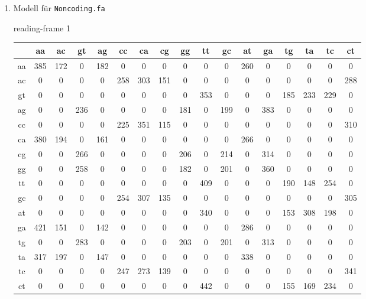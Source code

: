 \documentclass{homework}
\begin{document}
\begin{enumerate}
\begin{enumerate}
\normalsize

\item Modell für \texttt{Noncoding.fa}

reading-frame 1
\tiny

\begin{tabular}{c|cccccccccccccccc}
   & aa & ac & gt & ag & cc & ca & cg & gg & tt & gc & at & ga & tg & ta & tc & ct\\\hline
aa & 385 & 172 &   0 & 182 &   0 &   0 &   0 &   0 &   0 &   0 & 260 &   0 &   0 &   0 &   0 &   0\\
ac &   0 &   0 &   0 &   0 & 258 & 303 & 151 &   0 &   0 &   0 &   0 &   0 &   0 &   0 &   0 & 288\\
gt &   0 &   0 &   0 &   0 &   0 &   0 &   0 &   0 & 353 &   0 &   0 &   0 & 185 & 233 & 229 &   0\\
ag &   0 &   0 & 236 &   0 &   0 &   0 &   0 & 181 &   0 & 199 &   0 & 383 &   0 &   0 &   0 &   0\\
cc &   0 &   0 &   0 &   0 & 225 & 351 & 115 &   0 &   0 &   0 &   0 &   0 &   0 &   0 &   0 & 310\\
ca & 380 & 194 &   0 & 161 &   0 &   0 &   0 &   0 &   0 &   0 & 266 &   0 &   0 &   0 &   0 &   0\\
cg &   0 &   0 & 266 &   0 &   0 &   0 &   0 & 206 &   0 & 214 &   0 & 314 &   0 &   0 &   0 &   0\\
gg &   0 &   0 & 258 &   0 &   0 &   0 &   0 & 182 &   0 & 201 &   0 & 360 &   0 &   0 &   0 &   0\\
tt &   0 &   0 &   0 &   0 &   0 &   0 &   0 &   0 & 409 &   0 &   0 &   0 & 190 & 148 & 254 &   0\\
gc &   0 &   0 &   0 &   0 & 254 & 307 & 135 &   0 &   0 &   0 &   0 &   0 &   0 &   0 &   0 & 305\\
at &   0 &   0 &   0 &   0 &   0 &   0 &   0 &   0 & 340 &   0 &   0 &   0 & 153 & 308 & 198 &   0\\
ga & 421 & 151 &   0 & 142 &   0 &   0 &   0 &   0 &   0 &   0 & 286 &   0 &   0 &   0 &   0 &   0\\
tg &   0 &   0 & 283 &   0 &   0 &   0 &   0 & 203 &   0 & 201 &   0 & 313 &   0 &   0 &   0 &   0\\
ta & 317 & 197 &   0 & 147 &   0 &   0 &   0 &   0 &   0 &   0 & 338 &   0 &   0 &   0 &   0 &   0\\
tc &   0 &   0 &   0 &   0 & 247 & 273 & 139 &   0 &   0 &   0 &   0 &   0 &   0 &   0 &   0 & 341\\
ct &   0 &   0 &   0 &   0 &   0 &   0 &   0 &   0 & 442 &   0 &   0 &   0 & 155 & 169 & 234 &   0\\
\end{tabular}


\end{enumerate}
\end{enumerate}
\end{document}
